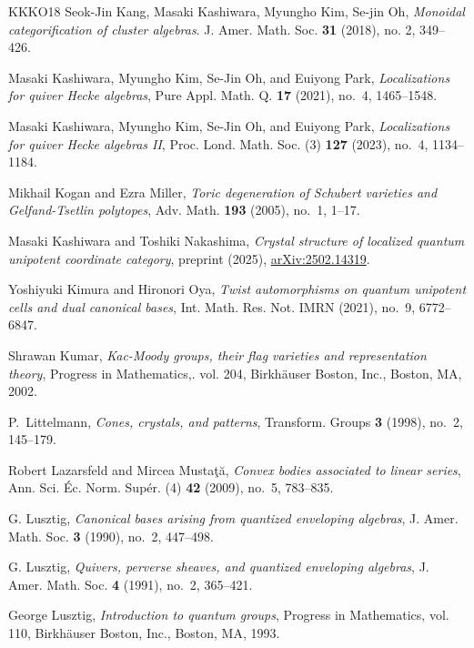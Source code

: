 \documentclass[11pt]{amsart}
\numberwithin{equation}{section}
\theoremstyle{plain}
\theoremstyle{definition}
\numberwithin{equation}{section}
\begin{document}
\begin{thebibliography}{KKKO18}
Seok-Jin Kang, Masaki Kashiwara, Myungho Kim, Se-jin Oh, \emph{Monoidal categorification of cluster algebras}. J. Amer. Math. Soc. \textbf{31} (2018), no. 2, 349--426.

Masaki Kashiwara, Myungho Kim, Se-Jin Oh, and Euiyong Park, \emph{Localizations for quiver {H}ecke algebras}, 
Pure Appl. Math. Q. \textbf{17} (2021), no.~4, 1465--1548.

Masaki Kashiwara, Myungho Kim, Se-Jin Oh, and Euiyong Park, \emph{Localizations for quiver {H}ecke algebras {II}}, 
Proc. Lond. Math. Soc. (3) \textbf{127} (2023), no.~4, 1134--1184.

Mikhail Kogan and Ezra Miller, \emph{Toric degeneration of {S}chubert varieties
  and {G}elfand-{T}setlin polytopes}, Adv. Math. \textbf{193} (2005), no.~1,
  1--17. 
  
Masaki Kashiwara and Toshiki Nakashima, \emph{Crystal structure of localized quantum unipotent coordinate category}, preprint (2025), \href{https://arxiv.org/abs/2502.14319}{arXiv:2502.14319}.

  
Yoshiyuki Kimura and Hironori Oya, \emph{Twist automorphisms on quantum
  unipotent cells and dual canonical bases}, Int. Math. Res. Not. IMRN (2021),
  no.~9, 6772--6847. 
  
  
Shrawan Kumar, \emph{Kac-Moody groups, their flag varieties and representation theory}, Progress in Mathematics,. vol. 204, Birkh{\"a}user Boston, Inc., Boston, MA, 2002.
  
P.~Littelmann, \emph{Cones, crystals, and patterns}, Transform. Groups
  \textbf{3} (1998), no.~2, 145--179. 

Robert Lazarsfeld and Mircea Musta\c{t}\u{a}, \emph{Convex bodies associated to
  linear series}, Ann. Sci. \'{E}c. Norm. Sup\'{e}r. (4) \textbf{42} (2009),
  no.~5, 783--835. 

G. Lusztig, \emph{Canonical bases arising from quantized enveloping algebras}, J. Amer. Math. Soc. \textbf{3} (1990), no.~2, 447--498.

G. Lusztig, \emph{Quivers, perverse sheaves, and quantized enveloping algebras}, J. Amer. Math. Soc. \textbf{4} (1991), no.~2, 365--421.

George Lusztig, \emph{Introduction to quantum groups}, Progress in Mathematics,
  vol. 110, Birkh\"{a}user Boston, Inc., Boston, MA, 1993. 
    

\end{thebibliography}
\end{document}

